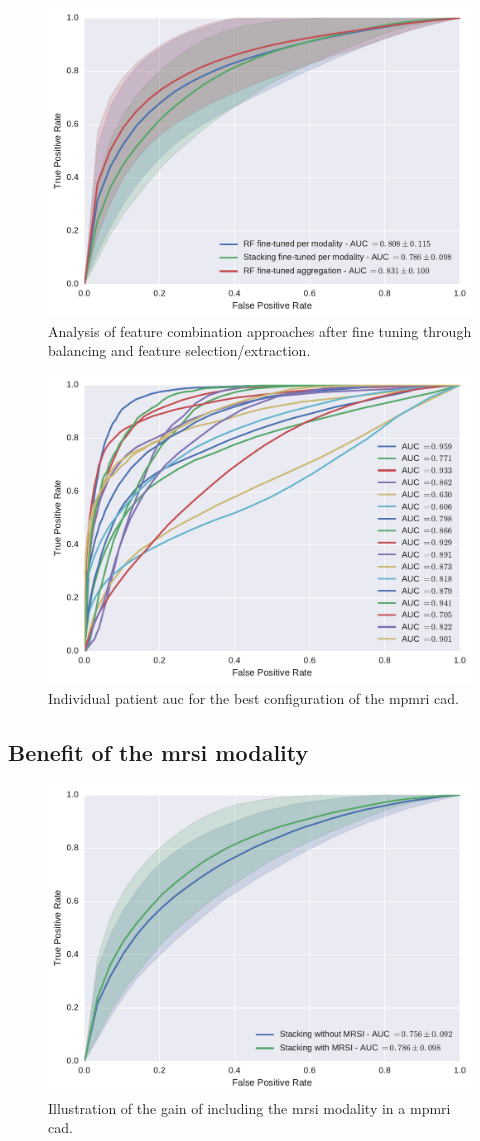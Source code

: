 \begin{figure}
  \centering
  \includegraphics[width=0.7\linewidth]{6_pipeline/figures/exp-5/combine_all.pdf}
  \caption[Analysis of feature combination approaches after fine tuning.]{Analysis of feature combination approaches after fine tuning through balancing and feature selection/extraction.}
  \label{fig:res-Ex4}
\end{figure}

\begin{figure}
  \centering
  \includegraphics[width=0.7\linewidth]{6_pipeline/figures/exp-5/plot_all_patients.pdf}
  \caption{Individual patient \acs*{auc} for the best configuration of the \acs*{mpmri} \acs*{cad}.}
  \label{fig:indauc}
\end{figure}

\subsection{Benefit of the \acs*{mrsi} modality}\label{subsec:chp6:exp-res:Ex5}

\begin{figure}
  \centering
  \includegraphics[width=0.7\linewidth]{6_pipeline/figures/exp-6/stacking_wt_mrsi.pdf}
  \caption{Illustration of the gain of including the \acs*{mrsi} modality in a \acs*{mpmri} \acs*{cad}.}
  \label{fig:resmrsigain}
\end{figure}
